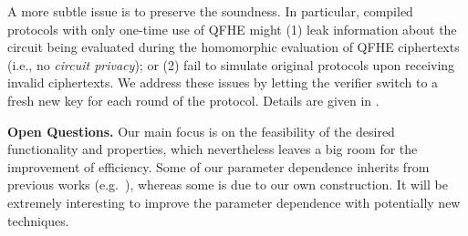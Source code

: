 A more subtle issue is to preserve the soundness.
In particular, compiled protocols with only one-time use of QFHE might (1) leak information about the circuit being evaluated during the homomorphic evaluation of QFHE ciphertexts (i.e., no \emph{circuit privacy});
or (2) fail to simulate original protocols upon receiving invalid ciphertexts.
We address these issues by letting the verifier switch to a fresh new key for each round of the protocol.
Details are given in .

\vspace{2mm} \noindent \textbf{Open Questions.} Our main focus is on the feasibility of the desired functionality and properties, which nevertheless leaves a big room for the improvement of efficiency.
Some of our parameter dependence inherits from previous works (e.g.~\cite{FOCS:Mahadev18a}), whereas some is due to our own construction. 
It will be extremely interesting to improve the parameter dependence with potentially new techniques. 




